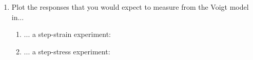\begin{activity}
\begin{exercises}
\begin{enumerate}
				\item Plot the responses that you would expect to measure from the Voigt model in...
					\begin{enumerate}
						\item ... a step-strain experiment:
						
						\item ... a step-stress experiment:
					\end{enumerate}
			\end{enumerate}
		
\end{exercises}
	
\end{activity}